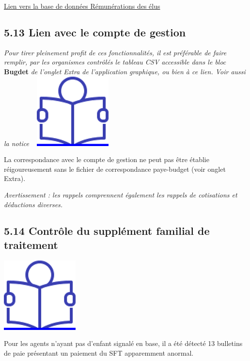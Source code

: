 \href{../Bases/Reglementation/remunerations.elu.csv}{Lien vers la base de
données Rémunérations des élus}

\hypertarget{lien-avec-le-compte-de-gestion}{%
\subsection{5.13 Lien avec le compte de
gestion}\label{lien-avec-le-compte-de-gestion}}

\emph{Pour tirer pleinement profit de ces fonctionnalités, il est
préférable de faire remplir, par les organismes contrôlés le tableau CSV
accessible dans le bloc} \textbf{Bugdet} \emph{de l'onglet Extra de
l'application graphique, ou bien à ce lien. Voir aussi la notice} ~
\href{../Docs/Notices/fiche_tableau_budget.odt}{\includegraphics{icones/Notice.png}}

La correspondance avec le compte de gestion ne peut pas être établie
réigoureusement sans le fichier de correspondance paye-budget (voir
onglet Extra).

\emph{Avertissement : les rappels comprennent également les rappels de
cotisations et déductions diverses.}

\hypertarget{controle-du-supplement-familial-de-traitement}{%
\subsection{5.14 Contrôle du supplément familial de
traitement}\label{controle-du-supplement-familial-de-traitement}}

\href{../Docs/Notices/fiche_SFT.odt}{\includegraphics{icones/Notice.png}}

Pour les agents n'ayant pas d'enfant signalé en base, il a été détecté
13 bulletins de paie présentant un paiement du SFT apparemment anormal.

